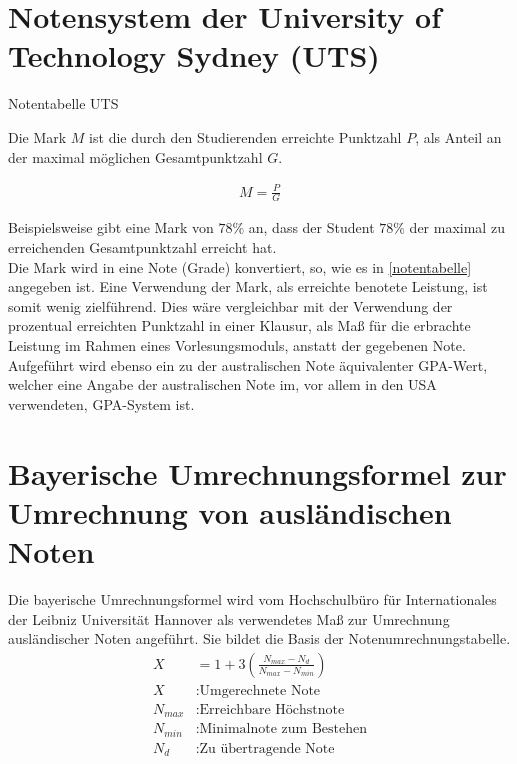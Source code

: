 \documentclass[12pt]{scrartcl}
\begin{document}
\section{Notensystem der University of Technology Sydney (UTS)} 
\begin{table}[!ht]
    \centering
    \caption{Notentabelle UTS}
    \label{notentabelle}
\end{table}
Die Mark $M$ ist die durch den Studierenden erreichte Punktzahl $P$, als Anteil an der maximal möglichen Gesamtpunktzahl $G$. 

\begin{align*}
    M = \frac{P}{G}
\end{align*}

Beispielsweise gibt eine Mark von $78 \%$ an, dass der Student $78 \%$ der maximal zu erreichenden Gesamtpunktzahl erreicht hat. \\
Die Mark wird in eine Note (Grade) konvertiert, so, wie es in \autoref{notentabelle} angegeben ist. Eine Verwendung der Mark, als erreichte benotete Leistung, ist somit wenig zielführend. Dies wäre vergleichbar mit der Verwendung der prozentual erreichten Punktzahl in einer Klausur, als Maß für die erbrachte Leistung im Rahmen eines Vorlesungsmoduls, anstatt der gegebenen Note. \\
Aufgeführt wird ebenso ein zu der australischen Note äquivalenter GPA-Wert, welcher eine Angabe der australischen Note im, vor allem in den USA verwendeten, GPA-System ist. 
\newpage

\section{Bayerische Umrechnungsformel zur Umrechnung von ausländischen Noten}
Die bayerische Umrechnungsformel wird vom Hochschulbüro für Internationales der Leibniz Universität Hannover als verwendetes Maß zur Umrechnung ausländischer Noten angeführt. Sie bildet die Basis der Notenumrechnungstabelle. \cite{LUHNotenumrechnung}
\begin{align*}
    X &= 1 + 3 \left(\frac{N_{max}-N_d}{N_{max}-N_{min}}\right)\\[1ex]
    X &: \textrm{Umgerechnete Note}\\[0.5ex]
    N_{max} &: \textrm{Erreichbare Höchstnote}\\[0.5ex]
    N_{min} &: \textrm{Minimalnote zum Bestehen} \\[0.5ex]
    N_{d} &: \textrm{Zu übertragende Note}
\end{align*}
\end{document}
